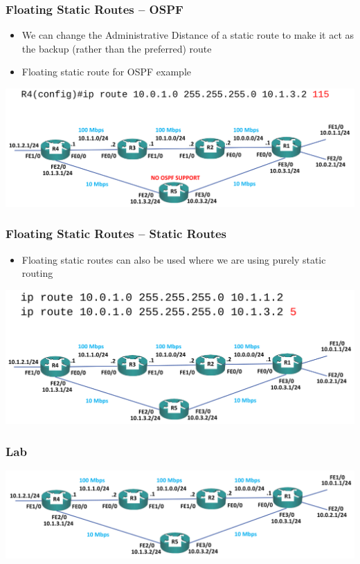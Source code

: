 \documentclass[pdflatex,compress,mathserif]{beamer}
\begin{document}
\begin{frame}
	\frametitle{Floating Static Routes – OSPF}
	\begin{itemize}
		\item We can change the Administrative Distance of a static route to make it
act as the backup (rather than the preferred) route
		\item Floating static route for OSPF example
	\end{itemize}
	\begin{center}
		\includegraphics[width=\linewidth]{img/img30}
	\end{center}
\end{frame}

\begin{frame}
	\frametitle{Floating Static Routes – Static Routes}
	\begin{itemize}
		\item Floating static routes can also be used where we are using purely static
routing
	\end{itemize}
	\begin{center}
		\includegraphics[width=\linewidth]{img/img31}
	\end{center}
\end{frame}

\begin{frame}
	\frametitle{Lab}
	\begin{center}
		\includegraphics[width=\linewidth]{img/img32}
	\end{center}
\end{frame}
\end{document}
